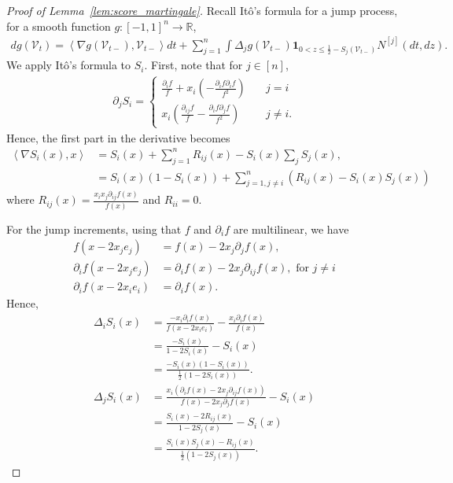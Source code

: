 \documentclass[11pt]{article}
\newcommand{\rV}{\mathscr{V}}
\newcommand{\Nj}{N^{[j]}}
\theoremstyle{named}
\theoremstyle{plain}
\newcommand{\real}{\ensuremath{\mathbb{R}}}
\newcommand{\parenth}[1]{\left( #1 \right)}
\newcommand{\angles}[1]{\left\langle #1 \right \rangle}
\begin{document}
\begin{proof}[Proof of Lemma~\ref{lem:score_martingale}]
Recall It\^o's formula for a jump process, for a smooth function $g: [-1,1]^n \to \real$, 
\begin{align*}
  d g(\rV_t) = \angles{\nabla g (\rV_{t-}) , \rV_{t-}} dt + \sum_{j=1}^n \int \Delta_j g(\rV_{t-}) \mathbf{1}_{0 < z \leq \frac12 - S_{j}(\rV_{t-})} \Nj(dt, dz).   
\end{align*}
We apply It\^o's formula to $S_i$. First, note that for $j \in [n]$, 
  \begin{align*}
    \partial_j S_i = \begin{cases}
      \frac{\partial_i f}{f} + x_i \parenth{-\frac{\partial_i f \partial_i f}{f^2}}  & \quad j = i\\
      x_i \parenth{\frac{\partial_{ij} f}{f} - \frac{\partial_i f \partial_j f}{f^2}} & \quad j\neq i.
    \end{cases}
  \end{align*}  
  Hence, the first part in the derivative becomes
  \begin{align*}
    \angles{\nabla S_i(x), x} &= S_i(x) + \sum_{j=1}^n R_{ij}(x) - S_i(x)\sum_j S_j(x), \\
    &= S_i(x) (1-S_i(x)) + \sum_{j=1, j \neq i}^n \parenth{R_{ij}(x) - S_i(x) S_j(x)}
  \end{align*}
  where $R_{ij}(x) = \frac{x_i x_j \partial_{ij} f(x)}{f(x)}$ and $R_{ii} = 0$.
  
  For the jump increments, using that $f$ and $\partial_i f$ are multilinear, we have
  \begin{align*}
    f(x - 2x_j e_j) &= f(x) - 2 x_j \partial_j f(x), \\
    \partial_i f(x - 2x_j e_j) &= \partial_i f(x) - 2 x_j \partial_{ij} f(x), \text{ for } j \neq i \\
    \partial_i f(x - 2x_i e_i) &= \partial_i f(x). 
  \end{align*}
  Hence,
  \begin{align*}
    \Delta_i S_i(x) &= \frac{-x_i \partial_i f(x)}{f(x - 2x_i e_i)} - \frac{x_i \partial_i f(x)}{f(x)} \\
    &= \frac{- S_i(x)}{1-2S_i(x)} - S_i(x) \\
    &= \frac{-S_i(x) (1-S_i(x))}{\frac12 (1-2S_i(x))}. \\
    \Delta_j S_i(x) &= \frac{x_i (\partial_i f(x) - 2 x_j \partial_{ij} f(x) ) }{f(x) - 2 x_j \partial_j f(x)} - S_i(x) \\
    &= \frac{S_i(x) - 2R_{ij}(x)}{1-2S_j(x)} - S_i(x) \\
    &= \frac{S_i(x) S_j(x) - R_{ij}(x)}{\frac12 (1-2S_j(x))}.
  \end{align*}


\end{proof}
\end{document}

